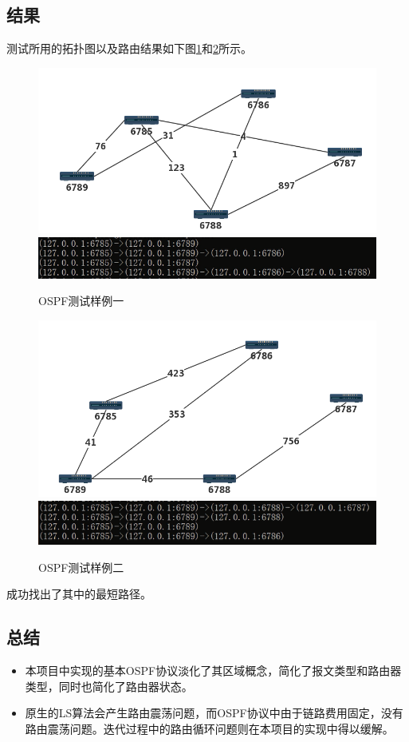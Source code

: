 	\subsection{结果} %
	\label{sub:结果}
		测试所用的拓扑图以及路由结果如下图\ref{fig:ospfTest1}和\ref{fig:ospfTest2}所示。
		\begin{figure}[H]
			\centering
			\includegraphics[scale=0.4]{imgs/topo2/tpop1.png}
			\includegraphics[scale=1]{imgs/ospfTest1.PNG}
			\caption{OSPF测试样例一}
			\label{fig:ospfTest1}
		\end{figure}
		\begin{figure}[H]
			\centering
			\includegraphics[scale=0.4]{imgs/topo2/topo2.png}
			\includegraphics[scale=1]{imgs/ospfTest2.PNG}
			\caption{OSPF测试样例二}
			\label{fig:ospfTest2}
		\end{figure}
		成功找出了其中的最短路径。
	\subsection{总结} %
	\label{sub:总结}
		\begin{itemize}
			\item 本项目中实现的基本OSPF协议淡化了其区域概念，简化了报文类型和路由器类型，同时也简化了路由器状态。
			\item 原生的LS算法会产生路由震荡问题，而OSPF协议中由于链路费用固定，没有路由震荡问题。迭代过程中的路由循环问题则在本项目的实现中得以缓解。
		\end{itemize}
	

